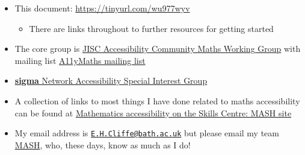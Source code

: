 \documentclass[
  12pt,
  a4paper]{extarticle}
\providecommand{\tightlist}{%
  \setlength{\itemsep}{0pt}\setlength{\parskip}{0pt}}
\theoremstyle{plain}
\theoremstyle{plain}
\theoremstyle{plain}
\theoremstyle{plain}
\theoremstyle{plain}
\theoremstyle{definition}
\theoremstyle{definition}
\theoremstyle{definition}
\theoremstyle{remark}
\renewcommand{\;}{\,}
\begin{document}
\begin{itemize}
\tightlist
\item
  This document: \url{https://tinyurl.com/wu977wyv}

  \begin{itemize}
  \tightlist
  \item
    There are links throughout to further resources for getting started
  \end{itemize}
\item
  The core group is \href{https://github.com/A11yMaths}{JISC Accessibility Community Maths Working Group} with mailing list \href{https://www.jiscmail.ac.uk/cgi-bin/webadmin?A0=ACCESSIBLE-MATHS}{A11yMaths mailing list}
\item
  \href{http://www.sigma-network.ac.uk/sigs/accessibility-sig/}{\textbf{sigma} Network Accessibility Special Interest Group}
\item
  A collection of links to most things I have done related to maths accessibility can be found at \href{https://www.bath.ac.uk/projects/mathematics-accessibility/}{Mathematics accessibility on the Skills Centre: MASH site}
\item
  My email address is \href{mailto:E.H.Cliffe@bath.ac.uk}{\nolinkurl{E.H.Cliffe@bath.ac.uk}} but please email my team \href{mailto:mash@bath.ac.uk}{MASH}, who, these days, know as much as I do!
\end{itemize}
\end{document}
